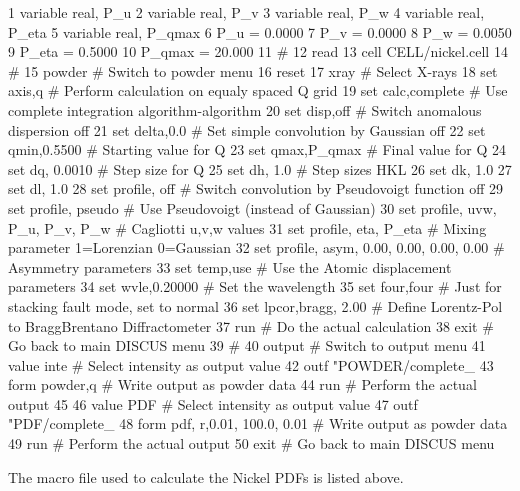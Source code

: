 \begin{MacVerbatim}
  1 variable real, P_u
  2 variable real, P_v
  3 variable real, P_w
  4 variable real, P_eta
  5 variable real, P_qmax
  6 P_u = 0.0000
  7 P_v = 0.0000
  8 P_w = 0.0050
  9 P_eta = 0.5000
 10 P_qmax = 20.000
 11 #
 12 read
 13 cell CELL/nickel.cell
 14 #
 15 powder                          # Switch to powder menu
 16   reset
 17   xray                          # Select X-rays
 18   set axis,q                    # Perform calculation on equaly spaced Q grid
 19   set calc,complete             # Use complete integration algorithm-algorithm
 20   set disp,off                  # Switch anomalous dispersion off
 21   set delta,0.0                 # Set simple convolution by Gaussian off
 22   set qmin,0.5500               # Starting value for Q
 23   set qmax,P_qmax               # Final value for Q
 24   set dq,  0.0010               # Step size for Q
 25   set dh, 1.0                   # Step sizes HKL
 26   set dk, 1.0
 27   set dl, 1.0
 28   set profile, off              # Switch convolution by Pseudovoigt function off
 29   set profile, pseudo           # Use Pseudovoigt (instead of Gaussian)
 30   set profile, uvw, P_u, P_v, P_w # Cagliotti u,v,w values 
 31   set profile, eta, P_eta       # Mixing parameter 1=Lorenzian 0=Gaussian
 32   set profile, asym, 0.00, 0.00, 0.00, 0.00 # Asymmetry parameters
 33   set temp,use                  # Use the Atomic displacement parameters
 34   set wvle,0.20000              # Set the wavelength
 35   set four,four                 # Just for stacking fault mode, set to normal
 36   set lpcor,bragg, 2.00         # Define Lorentz-Pol to BraggBrentano Diffractometer
 37   run                           # Do the actual calculation
 38 exit                            # Go back to main DISCUS menu
 39 #
 40 output                          # Switch to output menu
 41   value inte                    # Select intensity as output value
 42   outf  "POWDER/complete_%
 43   form  powder,q                # Write output as powder data
 44   run                           # Perform the actual output
 45
 46   value PDF                     # Select intensity as output value
 47   outf  "PDF/complete_%
 48   form  pdf, r,0.01, 100.0, 0.01  # Write output as powder data
 49   run                           # Perform the actual output
 50 exit                            # Go back to main DISCUS menu
\end{MacVerbatim}
%
The macro file used to calculate the Nickel PDFs is listed above.
